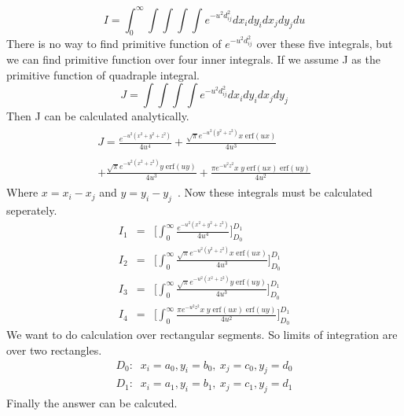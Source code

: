 \documentclass[twoside,twocolumn]{article}
\begin{document}
\begin{equation}
\label {eq10}
I = \int_0^{\infty}\int \int \int \int e^{-u^2 d_{ij}^2} dx_i dy_i dx_j dy_j du
\end{equation}
There is no way to find primitive function of $e^{-u^2 d_{ij}^2}$ over these five integrals, but we can find primitive function over four inner integrals. If we assume J as the primitive function of quadraple integral.
\begin{equation}
\label {eq11}
J = \int \int \int \int e^{-u^2 d_{ij}^2 } dx_i dy_i dx_j dy_j  
\end{equation}
Then J can be calculated analytically.
\begin{eqnarray}\label {eq12}
\begin{array}{lll}

J = \frac{e^{-u^2(x^2+y^2+z^2)}}{4u^4}+\frac{\sqrt{\pi}e^{-u^2(y^2 + z^2)}x\; \mathrm{erf}(u x)}{4u^3}\\ \\
+\frac{\sqrt{\pi}e^{-u^2(x^2 + z^2)}y\; \mathrm {erf}(u y)}{4u^3}+\frac{\pi e^{-u^2 z^2}x\;y\; \mathrm{erf}(u x)\; \mathrm{erf}(u y)}{4u^2}
\end{array}
\end{eqnarray}
Where $x = x_i - x_j$ and $y = y_i - y_j$\ . 
Now these integrals must be calculated seperately.
\begin{equation}\label {eq13}
\begin{array}{lll}

I_1& = &\big[\int_0^{\infty}\frac{e^{-u^2(x^2+y^2+z^2)}}{4u^4}\big]_{D_0}^{D_1}\\
I_2& = &\big[\int_0^{\infty}\frac{\sqrt{\pi}e^{-u^2(y^2 + z^2)}x\; \mathrm{erf}(u x)}{4u^3}\big]_{D_0}^{D_1}\\ 
I_3& = &\big[\int_0^{\infty}\frac{\sqrt{\pi}e^{-u^2(x^2 + z^2)}y\; \mathrm {erf}(u y)}{4u^3}\big]_{D_0}^{D_1}\\
I_4& = &\big[\int_0^{\infty}\frac{\pi e^{-u^2 z^2}x\;y\; \mathrm{erf}(u x)\; \mathrm{erf}(u y)}{4u^2}\big]_{D_0}^{D_1}
\end{array}
\end{equation}
We want to do calculation over rectangular segments. So limits of integration are over two rectangles.
\begin{eqnarray}\label {eq14}
D_0:\;\;x_i=a_0, y_i = b_0,\ x_j = c_0,y_j = d_0\nonumber\\
D_1:\;\;x_i=a_1, y_i = b_1, \ x_j = c_1,y_j = d_1
\end{eqnarray}
Finally the answer can be calcuted.
\end{document}
